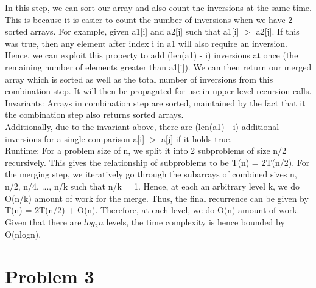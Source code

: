 \documentclass[12pt,letterpaper]{article}
\begin{document}
    In this step, we can sort our array and also count the inversions at the same time.
    This is because it is easier to count the number of inversions when we have 2 sorted arrays.
    For example, given a1[i] and a2[j] such that a1[i] $>$ a2[j].
    If this was true, then any element after index i in a1 will also require an inversion.
    Hence, we can exploit this property to add (len(a1) - i) inversions at once (the remaining number of elements greater than a1[i]).
    We can then return our merged array which is sorted as well as the total number of inversions from this combination step.
    It will then be propagated for use in upper level recursion calls. \\
    
    Invariants: 
    Arrays in combination step are sorted, maintained by the fact that it the combination step also returns sorted arrays. \\
    Additionally, due to the invariant above, there are (len(a1) - i) additional inversions for a single comparison a[i] $>$ a[j] if it holds true. \\
    
    Runtime: 
    For a problem size of n, we split it into 2 subproblems of size n/2 recursively. 
    This gives the relationship of subproblems to be T(n) = 2T(n/2).
    For the merging step, we iteratively go through the subarrays of combined sizes n, n/2, n/4, ..., n/k such that n/k = 1.
    Hence, at each an arbitrary level k, we do O(n/k) amount of work for the merge. 
    Thus, the final recurrence can be given by T(n) = 2T(n/2) + O(n). 
    Therefore, at each level, we do O(n) amount of work.
    Given that there are $log_2 n$ levels, the time complexity is hence bounded by O(nlogn).

\newpage

\section*{Problem 3}
\end{document}
